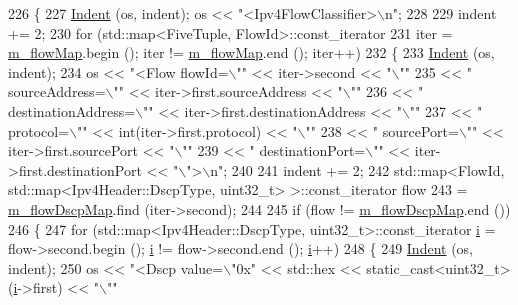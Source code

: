 \begin{DoxyCode}
226 \{
227   \hyperlink{classns3_1_1FlowClassifier_adc5d8694d3c9059b5ac2c664e5897088}{Indent} (os, indent); os << \textcolor{stringliteral}{"<Ipv4FlowClassifier>\(\backslash\)n"};
228 
229   indent += 2;
230   \textcolor{keywordflow}{for} (std::map<FiveTuple, FlowId>::const\_iterator
231        iter = \hyperlink{classns3_1_1Ipv4FlowClassifier_abd62b87d946068783f98976126e131b6}{m\_flowMap}.begin (); iter != \hyperlink{classns3_1_1Ipv4FlowClassifier_abd62b87d946068783f98976126e131b6}{m\_flowMap}.end (); iter++)
232     \{
233       \hyperlink{classns3_1_1FlowClassifier_adc5d8694d3c9059b5ac2c664e5897088}{Indent} (os, indent);
234       os << \textcolor{stringliteral}{"<Flow flowId=\(\backslash\)""} << iter->second << \textcolor{stringliteral}{"\(\backslash\)""}
235          << \textcolor{stringliteral}{" sourceAddress=\(\backslash\)""} << iter->first.sourceAddress << \textcolor{stringliteral}{"\(\backslash\)""}
236          << \textcolor{stringliteral}{" destinationAddress=\(\backslash\)""} << iter->first.destinationAddress << \textcolor{stringliteral}{"\(\backslash\)""}
237          << \textcolor{stringliteral}{" protocol=\(\backslash\)""} << int(iter->first.protocol) << \textcolor{stringliteral}{"\(\backslash\)""}
238          << \textcolor{stringliteral}{" sourcePort=\(\backslash\)""} << iter->first.sourcePort << \textcolor{stringliteral}{"\(\backslash\)""}
239          << \textcolor{stringliteral}{" destinationPort=\(\backslash\)""} << iter->first.destinationPort << \textcolor{stringliteral}{"\(\backslash\)">\(\backslash\)n"};
240 
241       indent += 2;
242       std::map<FlowId, std::map<Ipv4Header::DscpType, uint32\_t> >::const\_iterator flow
243         = \hyperlink{classns3_1_1Ipv4FlowClassifier_ab4fecdf812fb864667d27d028e184784}{m\_flowDscpMap}.find (iter->second);
244 
245       \textcolor{keywordflow}{if} (flow != \hyperlink{classns3_1_1Ipv4FlowClassifier_ab4fecdf812fb864667d27d028e184784}{m\_flowDscpMap}.end ())
246         \{
247           \textcolor{keywordflow}{for} (std::map<Ipv4Header::DscpType, uint32\_t>::const\_iterator \hyperlink{bernuolliDistribution_8m_a6f6ccfcf58b31cb6412107d9d5281426}{i} = flow->second.begin (); 
      \hyperlink{bernuolliDistribution_8m_a6f6ccfcf58b31cb6412107d9d5281426}{i} != flow->second.end (); \hyperlink{bernuolliDistribution_8m_a6f6ccfcf58b31cb6412107d9d5281426}{i}++)
248             \{
249               \hyperlink{classns3_1_1FlowClassifier_adc5d8694d3c9059b5ac2c664e5897088}{Indent} (os, indent);
250               os << \textcolor{stringliteral}{"<Dscp value=\(\backslash\)"0x"} << std::hex << static\_cast<uint32\_t> (\hyperlink{bernuolliDistribution_8m_a6f6ccfcf58b31cb6412107d9d5281426}{i}->first) << \textcolor{stringliteral}{"\(\backslash\)""}

\end{DoxyCode}
